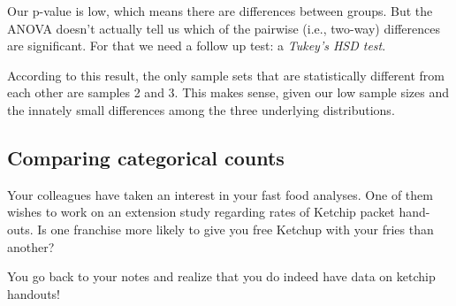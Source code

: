 \documentclass[
]{book}
\newenvironment{Shaded}{\begin{snugshade}}{\end{snugshade}}
\newcommand{\DataTypeTok}[1]{\textcolor[rgb]{0.13,0.29,0.53}{#1}}
\newcommand{\DecValTok}[1]{\textcolor[rgb]{0.00,0.00,0.81}{#1}}
\newcommand{\FloatTok}[1]{\textcolor[rgb]{0.00,0.00,0.81}{#1}}
\newcommand{\KeywordTok}[1]{\textcolor[rgb]{0.13,0.29,0.53}{\textbf{#1}}}
\newcommand{\NormalTok}[1]{#1}
\newcommand{\OperatorTok}[1]{\textcolor[rgb]{0.81,0.36,0.00}{\textbf{#1}}}
\newcommand{\StringTok}[1]{\textcolor[rgb]{0.31,0.60,0.02}{#1}}
\begin{document}
Our p-value is low, which means there are differences between groups. But the ANOVA doesn't actually tell us which of the pairwise (i.e., two-way) differences are significant. For that we need a follow up test: a \emph{Tukey's HSD test}.

\begin{Shaded}
\end{Shaded}

According to this result, the only sample sets that are statistically different from each other are samples 2 and 3. This makes sense, given our low sample sizes and the innately small differences among the three underlying distributions.

\hypertarget{comparing-categorical-counts}{%
\subsection*{Comparing categorical counts}\label{comparing-categorical-counts}}

Your colleagues have taken an interest in your fast food analyses. One of them wishes to work on an extension study regarding rates of Ketchip packet hand-outs. Is one franchise more likely to give you free Ketchup with your fries than another?

You go back to your notes and realize that you do indeed have data on ketchip handouts!
\end{document}

